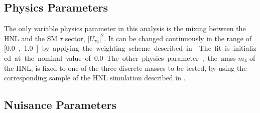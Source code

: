 \subsection{Physics Parameters} 

The only variable physics parameter in this analysis is the mixing between the HNL and the SM $\tau$ sector, $|U_{\tau4}|^2$. It can be changed continuously in the range of [\SI{0.0}, \SI{1.0}] by applying the weighting scheme described in . The fit is initialized at the nominal value of \SI{0.0}. The other physics parameter, the mass $m_4$ of the HNL, is fixed to one of the three discrete masses to be tested, by using the corresponding sample of the HNL simulation described in .


\subsection{Nuisance Parameters} 


